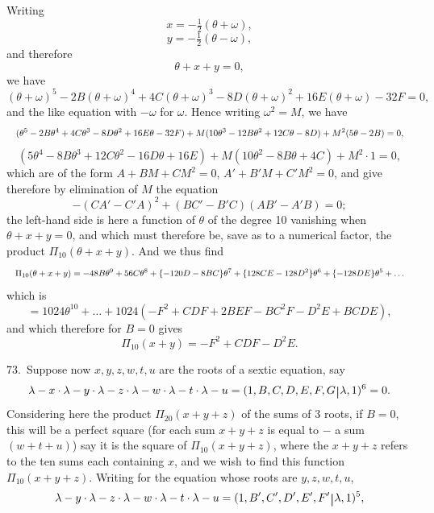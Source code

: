 \documentclass[11pt]{article}
\begin{document}
\clearpage
Writing
\[
x = -\tfrac{1}{2}(\theta + \omega),
\]
\[
y = -\tfrac{1}{2}(\theta - \omega),
\]
and therefore
\[
\theta + x + y = 0,
\]
we have
\[
(\theta + \omega)^5 - 2B(\theta + \omega)^4 + 4C(\theta + \omega)^3 - 8D(\theta + \omega)^2 + 16E(\theta + \omega) - 32F = 0,
\]
and the like equation with $-\omega$ for $\omega$. Hence writing $\omega^2 = M$, we have
\[
\resizebox{\textwidth}{!}{$\displaystyle
(\theta^5 - 2B\theta^4 + 4C\theta^3 - 8D\theta^2 + 16E\theta - 32F) + M(10\theta^3 - 12B\theta^2 + 12C\theta - 8D) + M^2(5\theta - 2B) = 0,
$}
\]
\[
(5\theta^4 - 8B\theta^3 + 12C\theta^2 - 16D\theta + 16E) + M(10\theta^2 - 8B\theta + 4C) + M^2 \cdot 1 = 0,
\]
which are of the form $A + BM + CM^2 = 0$, $A' + B'M + C'M^2 = 0$, and give therefore by elimination of $M$ the equation
\[
-(CA' - C'A)^2 + (BC' - B'C)(AB' - A'B) = 0;
\]
the left-hand side is here a function of $\theta$ of the degree 10 vanishing when $\theta + x + y = 0$, and which must therefore be, save as to a numerical factor, the product $\Pi_{10}(\theta + x + y)$. And we thus find
\[
\resizebox{\textwidth}{!}{$\displaystyle
\Pi_{10}(\theta + x + y) = -48B\theta^9 + 56C\theta^8 + \{-120D - 8BC\}\theta^7 + \{128CE - 128D^2\}\theta^6 + \{-128DE\}\theta^5 + \ldots
$}
\]
which is
\[
= 1024\theta^{10} + \ldots + 1024(-F^2 + CDF + 2BEF - BC^2F - D^2E + BCDE),
\]
and which therefore for $B = 0$ gives
\[
\Pi_{10}(x + y) = -F^2 + CDF - D^2E.
\]

73.\ Suppose now $x, y, z, w, t, u$ are the roots of a sextic equation, say
\[
\lambda - x \cdot \lambda - y \cdot \lambda - z \cdot \lambda - w \cdot \lambda - t \cdot \lambda - u = (1, B, C, D, E, F, G\,\rule[-1ex]{0.6pt}{2.5ex}\,\lambda, 1)^6 = 0.
\]
Considering here the product $\Pi_{20}(x + y + z)$ of the sums of 3 roots, if $B = 0$, this will be a perfect square (for each sum $x + y + z$ is equal to $-$ a sum $(w + t + u)$) say it is the square of $\Pi_{10}(x + y + z)$, where the $x + y + z$ refers to the ten sums each containing $x$, and we wish to find this function $\Pi_{10}(x + y + z)$. Writing for the equation whose roots are $y, z, w, t, u$,
\[
\lambda - y \cdot \lambda - z \cdot \lambda - w \cdot \lambda - t \cdot \lambda - u = (1, B', C', D', E', F'\,\rule[-1ex]{0.6pt}{2.5ex}\,\lambda, 1)^5,
\]
\end{document}
